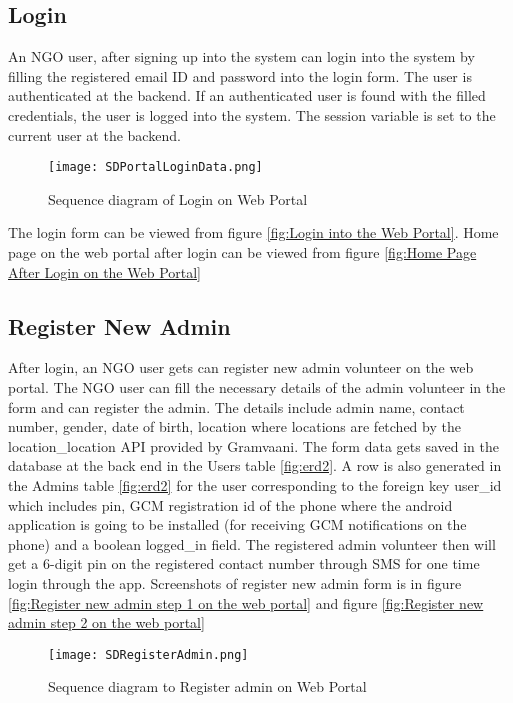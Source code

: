 \subsection{Login}
An NGO user, after signing up into the system can login into the system by filling the registered email ID and password into the login form. The user is authenticated at the backend. If an authenticated user is found with the filled credentials, the user is logged into the system. The session variable is set to the current user at the backend. 
\begin{figure}[H]
    \centering
	\texttt{[image: SDPortalLoginData.png]}
    \caption{Sequence diagram of Login on Web Portal}
    \label{fig:Sequence diagram of Login on Web Portal}
\end{figure}

The login form can be viewed from figure \ref{fig:Login into the Web Portal}. Home page on the web portal after login can be viewed from figure \ref{fig:Home Page After Login on the Web Portal}

\subsection{Register New Admin}
After login, an NGO user gets can register new admin volunteer on the web portal. The NGO user can fill the necessary details of the admin volunteer in the form and can register the admin. The details include admin name, contact number, gender, date of birth, location where locations are fetched by the location\_location API provided by Gramvaani. The form data gets saved in the database at the back end in the Users table \ref{fig:erd2}. A row is also generated in the Admins table \ref{fig:erd2} for the user corresponding to the foreign key user\_id which includes pin, GCM registration id of the phone where the android application is going to be installed (for receiving GCM notifications on the phone) and a boolean logged\_in field. The registered admin volunteer then will get a 6-digit pin on the registered contact number through SMS for one time login through the app. Screenshots of register new admin form is in figure \ref{fig:Register new admin step 1 on the web portal} and figure \ref{fig:Register new admin step 2 on the web portal}\\
\begin{figure}[H]
    \centering
	\texttt{[image: SDRegisterAdmin.png]}
    \caption{Sequence diagram to Register admin on Web Portal}
    \label{fig:Sequence diagram to Register admin on Web Portal}
\end{figure}

